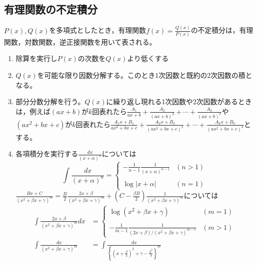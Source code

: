 \documentclass[dvipdfmx,a4j,10pt]{jsarticle}
\theoremstyle{mystyle1}
\theoremstyle{mystyle2}
\begin{document}
\subsection{有理関数の不定積分}
$P(x),Q(x)$を多項式としたとき，有理関数$\displaystyle f(x)=\frac{Q(x)}{P(x)}$の不定積分は，有理関数，対数関数，逆正接関数を用いて表される。
\begin{framed}
\begin{enumerate}
\item 除算を実行し$P(x)$の次数を$Q(x)$より低くする
\item $Q(x)$を可能な限り因数分解する。このとき1次因数と既約の2次因数の積となる。
\item 部分分数分解を行う。$Q(x)$に繰り返し現れる1次因数や2次因数があるときは，例えば$(ax+b)$が$k$回表れたら$\displaystyle \frac{A_1}{ax+b}+\frac{A_2}{(ax+b)^2}+\cdots+\frac{A_k}{(ax+b)^k}$や$(ax^2+bx+c)$が$k$回表れたら$\displaystyle \frac{A_1x+B_1}{ax^2+bx+c}+\frac{A_2x+B_2}{(ax^2+bx+c)^2}+\cdots+\frac{A_kx+B_k}{(ax^2+bx+c)^k}$とする。
\item 各項積分を実行する$\displaystyle \frac{dx}{(x+\alpha)^n}$については
\[
\int\frac{dx}{(x+\alpha)^n}=
\begin{cases}
\displaystyle-\frac{1}{n-1}\frac{1}{(x+\alpha)^{n-1}} & (n>1)\\
\\
\log{|x+\alpha|} & (n=1)
\end{cases}
\]
$\displaystyle\frac{Bx+C}{(x^2+\beta x+\gamma)^m}=\frac{B}{2}\frac{2x+\beta}{(x^2+\beta x+\gamma)^m}+\left(C-\frac{\beta B}{2}\right)\frac{1}{(x^2+\beta x+\gamma)^m}$については
\[
\begin{split}
\int \frac{2x+\beta}{(x^2+\beta x+\gamma)^m}dx& =
\begin{cases}
\displaystyle\log{(x^2+\beta x+\gamma)} & (m=1)\\
\\
\displaystyle-\frac{1}{m-1}\frac{1}{(2x+\beta)/(x^2+\beta x+\gamma)^{m-1}} & (m>1)
\end{cases}
\\
\int\frac{dx}{(x^2+\beta x+\gamma)^m}&=\int\frac{dx}{\left\{\left(x+\frac{\beta}{2}\right)^2+\gamma-\frac{\beta^2}{4}\right\}^m}
\end{split}
\]
\end{enumerate}
\end{framed}
\end{document}
